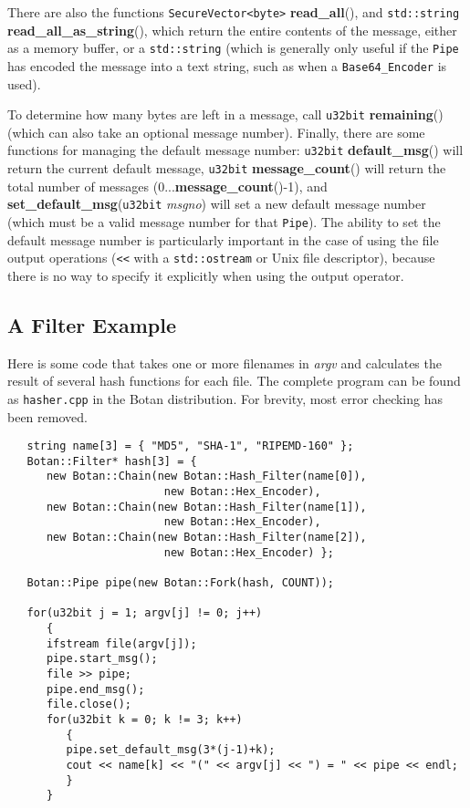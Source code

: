 \documentclass{article}
\newcommand{\filename}[1]{\texttt{#1}}
\newcommand{\function}[1]{\textbf{#1}}
\newcommand{\type}[1]{\texttt{#1}}
\renewcommand{\arg}[1]{\textsl{#1}}
\begin{document}
There are also the functions \type{SecureVector<byte>} \function{read\_all}(),
and \type{std::string} \function{read\_all\_as\_string}(), which return the
entire contents of the message, either as a memory buffer, or a
\type{std::string} (which is generally only useful if the \type{Pipe} has
encoded the message into a text string, such as when a \type{Base64\_Encoder}
is used).

To determine how many bytes are left in a message, call \type{u32bit}
\function{remaining}() (which can also take an optional message
number). Finally, there are some functions for managing the default message
number: \type{u32bit} \function{default\_msg}() will return the current default
message, \type{u32bit} \function{message\_count}() will return the total number
of messages (0...\function{message\_count}()-1), and
\function{set\_default\_msg}(\type{u32bit} \arg{msgno}) will set a new default
message number (which must be a valid message number for that \type{Pipe}). The
ability to set the default message number is particularly important in the case
of using the file output operations (\verb|<<| with a \type{std::ostream} or
Unix file descriptor), because there is no way to specify it explicitly when
using the output operator.

\subsection{A Filter Example}

Here is some code that takes one or more filenames in \arg{argv} and
calculates the result of several hash functions for each file. The complete
program can be found as \filename{hasher.cpp} in the Botan distribution. For
brevity, most error checking has been removed.

\begin{verbatim}
   string name[3] = { "MD5", "SHA-1", "RIPEMD-160" };
   Botan::Filter* hash[3] = {
      new Botan::Chain(new Botan::Hash_Filter(name[0]),
                        new Botan::Hex_Encoder),
      new Botan::Chain(new Botan::Hash_Filter(name[1]),
                        new Botan::Hex_Encoder),
      new Botan::Chain(new Botan::Hash_Filter(name[2]),
                        new Botan::Hex_Encoder) };

   Botan::Pipe pipe(new Botan::Fork(hash, COUNT));

   for(u32bit j = 1; argv[j] != 0; j++)
      {
      ifstream file(argv[j]);
      pipe.start_msg();
      file >> pipe;
      pipe.end_msg();
      file.close();
      for(u32bit k = 0; k != 3; k++)
         {
         pipe.set_default_msg(3*(j-1)+k);
         cout << name[k] << "(" << argv[j] << ") = " << pipe << endl;
         }
      }
\end{verbatim}
\end{document}
